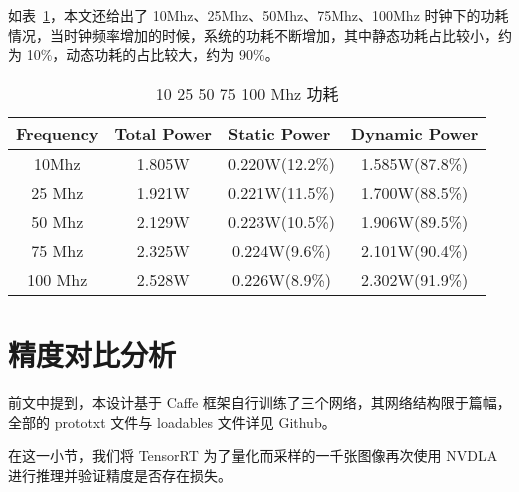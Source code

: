 如表~\ref{tab:10-100 Mhz Power}，本文还给出了 10Mhz、25Mhz、50Mhz、75Mhz、100Mhz 时钟下的功耗情况，当时钟频率增加的时候，系统的功耗不断增加，其中静态功耗占比较小，约为 10\%，动态功耗的占比较大，约为 90\%。

\begin{table}[!htbp]
    \caption{10 25 50 75 100 Mhz 功耗}
    \label{tab:10-100 Mhz Power}
    \centering
    \footnotesize%
    \setlength{\tabcolsep}{4pt}%
    \renewcommand{\arraystretch}{1.2}%
    \begin{tabular}{cccc}
        \toprule
        \multicolumn{1}{l}{\textbf{Frequency}} & \multicolumn{1}{l}{\textbf{Total Power}} & \multicolumn{1}{l}{\textbf{Static Power}} & \multicolumn{1}{l}{\textbf{Dynamic Power}} \\
        \midrule
        10Mhz                                  & 1.805W                                   & 0.220W(12.2\%)                            & 1.585W(87.8\%)                             \\
        25 Mhz                                 & 1.921W                                   & 0.221W(11.5\%)                            & 1.700W(88.5\%)                             \\
        50 Mhz                                 & 2.129W                                   & 0.223W(10.5\%)                            & 1.906W(89.5\%)                             \\
        75 Mhz                                 & 2.325W                                   & 0.224W(9.6\%)                             & 2.101W(90.4\%)                             \\
        100 Mhz                                & 2.528W                                   & 0.226W(8.9\%)                             & 2.302W(91.9\%)                             \\
        \bottomrule                   
    \end{tabular}
\end{table}

\section{精度对比分析}

前文中提到，本设计基于 Caffe 框架自行训练了三个网络，其网络结构限于篇幅，全部的 prototxt 文件与 loadables 文件详见 Github\cite{nvdla_loadables}。

在这一小节，我们将 TensorRT 为了量化而采样的一千张图像再次使用 NVDLA 进行推理并验证精度是否存在损失。

